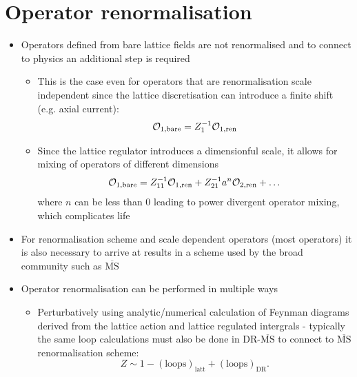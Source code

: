 \section{Operator renormalisation}
\begin{itemize}
    \item Operators defined from bare lattice fields are not renormalised and to connect to physics an additional step is required
    \begin{itemize}
        \item This is the case even for operators that are renormalisation scale independent since the lattice discretisation can introduce a finite shift (e.g. axial current): 
        \begin{equation}
            {\cal O}_{1,\text{bare}} = Z_1^{-1}\mathcal{O}_{1, \text{ren}}
        \end{equation}
        \item Since the lattice regulator introduces a dimensionful scale, it allows for mixing of operators of different dimensions 
        \begin{equation}
            {\cal O}_{1,\text{bare}} = Z_{11}^{-1}{\cal O}_{1, \text{ren}} + Z_{21}^{-1} a^n {\cal O}_{2, \text{ren}} + \ldots
        \end{equation}
        where $n$ can be less than $0$ leading to power divergent operator mixing, which complicates life
    \end{itemize}
    \item For renormalisation scheme and scale dependent operators (most operators) it is also necessary to arrive at results in a scheme used by the broad community such as $\overline{\text{MS}}$
    \item Operator renormalisation can be performed in multiple ways
    \begin{itemize}
        \item Perturbatively using analytic/numerical calculation of Feynman diagrams derived from the lattice action and lattice regulated intergrals - typically the same loop calculations must also be done in DR-$\overline{\text{MS}}$ to connect to $\overline{\text{MS}}$ renormalisation scheme: 
        \begin{equation}
            Z \sim 1 - (\text{loops})_\text{latt} + (\text{loops})_\text{DR}.
        \end{equation}

\end{itemize}
\end{itemize}
